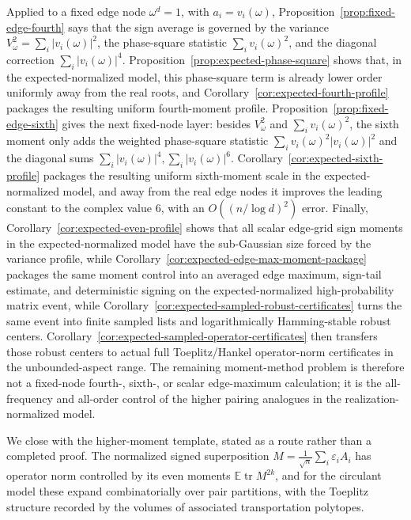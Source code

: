 \documentclass[11pt]{amsart}
\numberwithin{equation}{section}
\theoremstyle{definition}
\theoremstyle{remark}
\newcommand{\Exp}{\mathbb E}
\newcommand{\eps}{\varepsilon}
\begin{document}
Applied to a fixed edge node \(\omega^d=1\), with
\(a_i=v_i(\omega)\), Proposition~\ref{prop:fixed-edge-fourth} says that the
sign average is governed by the variance
\(V_\omega^2=\sum_i|v_i(\omega)|^2\), the phase-square statistic
\(\sum_i v_i(\omega)^2\), and the diagonal correction \(\sum_i|v_i(\omega)|^4\).
Proposition~\ref{prop:expected-phase-square} shows that, in the
expected-normalized model, this phase-square term is already lower order
uniformly away from the real roots, and
Corollary~\ref{cor:expected-fourth-profile} packages the resulting uniform
fourth-moment profile.  Proposition~\ref{prop:fixed-edge-sixth} gives the next
fixed-node layer: besides \(V_\omega^2\) and \(\sum_i v_i(\omega)^2\), the
sixth moment only adds the weighted phase-square statistic
\(\sum_i v_i(\omega)^2|v_i(\omega)|^2\) and the diagonal sums
\(\sum_i|v_i(\omega)|^4,\sum_i|v_i(\omega)|^6\).
Corollary~\ref{cor:expected-sixth-profile} packages the resulting uniform
sixth-moment scale in the expected-normalized model, and away from the real
edge nodes it improves the leading constant to the complex value \(6\), with
an \(O((n/\log d)^2)\) error.  Finally,
Corollary~\ref{cor:expected-even-profile} shows that all scalar edge-grid sign
moments in the expected-normalized model have the sub-Gaussian size forced by
the variance profile, while
Corollary~\ref{cor:expected-edge-max-moment-package} packages the same moment
control into an averaged edge maximum, sign-tail estimate, and deterministic
signing on the expected-normalized high-probability matrix event, while
Corollary~\ref{cor:expected-sampled-robust-certificates} turns the same event
into finite sampled lists and logarithmically Hamming-stable robust centers.
Corollary~\ref{cor:expected-sampled-operator-certificates} then transfers those
robust centers to actual full Toeplitz/Hankel operator-norm certificates in the
unbounded-aspect range.
The remaining
moment-method problem is therefore not a fixed-node fourth-, sixth-, or scalar
edge-maximum calculation; it is the
all-frequency and all-order control of the higher pairing analogues in the
realization-normalized model.

We close with the higher-moment template, stated as a route rather than a
completed proof. The normalized signed superposition
$M=\frac1{\sqrt n}\sum_i\eps_iA_i$ has operator norm controlled by its even
moments $\Exp\operatorname{tr}M^{2k}$, and for the circulant model these expand
combinatorially over pair partitions, with the Toeplitz structure recorded by the
volumes of associated transportation polytopes.
\end{document}

